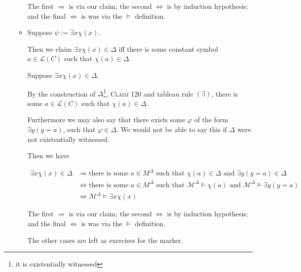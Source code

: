 \documentclass[a4paper]{article}
\newcommand{\MODEL}{\mathcal{M}}
\newcommand{\LANGUAGE}{\mathcal{L}}
\begin{document}
\begin{enumerate}
\begin{itemize}
    The first $\Rightarrow$ is via our claim; the second $\Leftrightarrow$ is by induction hypothesis; and the final $\Leftrightarrow$ is was via the $\models$ definition.

    \item Suppose $\psi := \exists x \chi (x)$. 
    
        Then we claim $\exists x \chi (x) \in \Delta$ iff there is some constant symbol $a \in \LANGUAGE (C)$ such that $\chi(a) \in \Delta$.

        Suppose $\exists x \chi (x) \in \Delta$. 

        By the construction of $\Delta$\footnote{it is existentially witnessed}, \textsc{Claim 120} and tableau rule $(\exists)$, there is some $a \in \LANGUAGE(C)$ such that $\chi(a) \in \Delta$. 
        
        Furthermore we may also say that there exists some $\varphi$ of the form $\exists y(y = a)$, such that $\varphi \in \Delta$. We would not be able to say this if $\Delta$ were not existentially witnessed.

        Then we have

    \begin{align*}
        \exists x \chi (x)\in \Delta & \Rightarrow \text{there is some } a \in M^{\Delta} \text{ such that } \chi(a) \in \Delta \text{ and } \exists y(y = a) \in \Delta\\
        & \Leftrightarrow \text{there is some } a \in M^{\Delta} \text{ such that } \MODEL^{\Delta} \models \chi (a) \text{ and } \MODEL^{\Delta} \models \exists y(y = a)\\
        & \Leftrightarrow \MODEL^{\Delta} \models \exists x \chi (x)
    \end{align*}

    The first $\Rightarrow$ is via our claim; the second $\Leftrightarrow$ is by induction hypothesis; and the final $\Leftrightarrow$ is was via the $\models$ definition.

    The other cases are left as exercises for the marker.



\end{itemize}

\end{enumerate}
\end{document}
